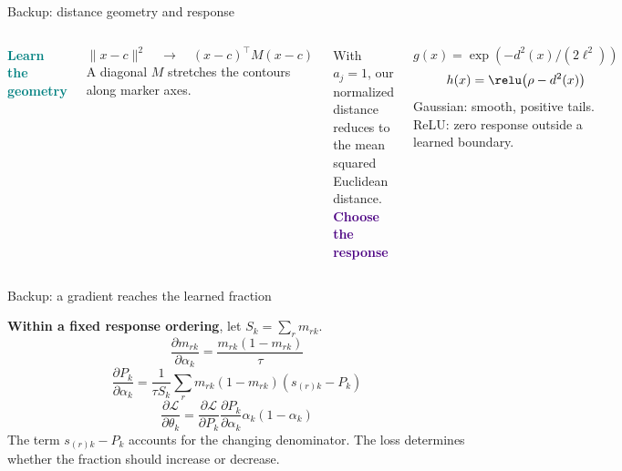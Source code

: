 \appendix

\begin{frame}{Backup: distance geometry and response}

\begin{columns}[T,onlytextwidth]
\textcolor{Teal}{\textbf{Learn the geometry}}\par
\[\|x-c\|^2\quad\longrightarrow\quad (x-c)^\top M(x-c)\]
A diagonal $M$ stretches the contours along marker axes.\par
\vspace{3mm}
With $a_j=1$, our normalized distance reduces to the mean squared Euclidean distance.
\textcolor{Indigo}{\textbf{Choose the response}}\par
\[g(x)=\exp\!\left(-d^2(x)/(2\ell^2)\right)\]
\[h(x)=\relu\!\left(\rho-d^2(x)\right)\]
Gaussian: smooth, positive tails.\\
ReLU: zero response outside a learned boundary.
\end{columns}

\end{frame}

\begin{frame}{Backup: a gradient reaches the learned fraction}

\textbf{Within a fixed response ordering}, let $S_k=\sum_r m_{rk}$.
\[\frac{\partial m_{rk}}{\partial\alpha_k}=\frac{m_{rk}(1-m_{rk})}{\tau}\]
\[\boxed{\frac{\partial P_k}{\partial\alpha_k}
=\frac1{\tau S_k}\sum_r m_{rk}(1-m_{rk})(s_{(r)k}-P_k)}\]
\[\frac{\partial\mathcal L}{\partial\theta_k}
=\frac{\partial\mathcal L}{\partial P_k}
\frac{\partial P_k}{\partial\alpha_k}\alpha_k(1-\alpha_k)\]
\small The term $s_{(r)k}-P_k$ accounts for the changing denominator. The loss determines whether the fraction should increase or decrease.

\end{frame}

